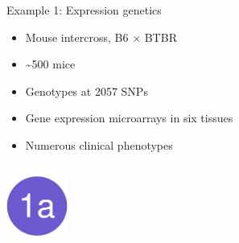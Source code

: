 \documentclass[final,plain]{beamer}
\newlength{\sepwid}
\newlength{\onecolwid}
\newlength{\twocolwid}
\newcommand{\bi}{\begin{itemize}}
\newcommand{\ei}{\end{itemize}}
\begin{document}
\begin{frame}[t]
\begin{columns}[t]
  \begin{column}{\twocolwid}
    \begin{exampleblock}{\Large Example 1: Expression genetics}{
    \begin{center}
    \begin{minipage}[t]{0.6\onecolwid}
    \vspace*{0mm}

    \bi
    \item Mouse intercross, B6 $\times$ BTBR
    \item {\textasciitilde}500 mice
    \item Genotypes at 2057 SNPs
    \ei

    \end{minipage}
    \hspace{0.5\sepwid}
    \begin{minipage}[t]{0.7\onecolwid}
    \vspace*{0mm}

    \bi
    \item Gene expression microarrays in six tissues
    \item Numerous clinical phenotypes
    \ei

    \end{minipage} \end{center}
    }
    \end{exampleblock}

    \vspace{1mm} %

    \begin{columns}[t]

      \begin{column}{\onecolwid}

        \href{http://www.biostat.wisc.edu/~kbroman/posters/ENAR2014/1a}{\includegraphics[width=2cm]{Figs/dot1a.pdf}}


\end{column}
\end{columns}
\end{column}
\end{columns}
\end{frame}
\end{document}
